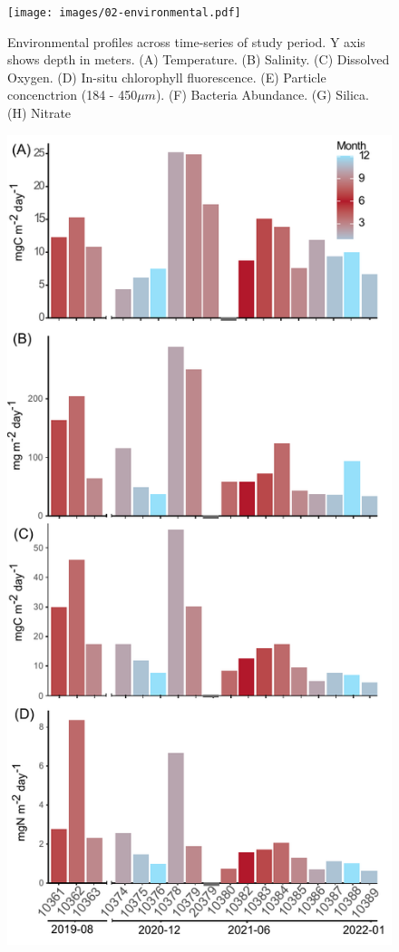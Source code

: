 \documentclass[
]{article}
\begin{document}
\begin{figure}

{\centering \texttt{[image: images/02-environmental.pdf]}

}

\caption{Environmental profiles across time-series of study period. Y
axis shows depth in meters. (A) Temperature. (B) Salinity. (C) Dissolved
Oxygen. (D) In-situ chlorophyll fluorescence. (E) Particle concenctrion
(184 - 450\(\mu m\)). (F) Bacteria Abundance. (G) Silica. (H) Nitrate}

\end{figure}

\newpage

\begin{figure}

{\centering \includegraphics{images/03_prod-flux.pdf}

}
\end{figure}
\end{document}
